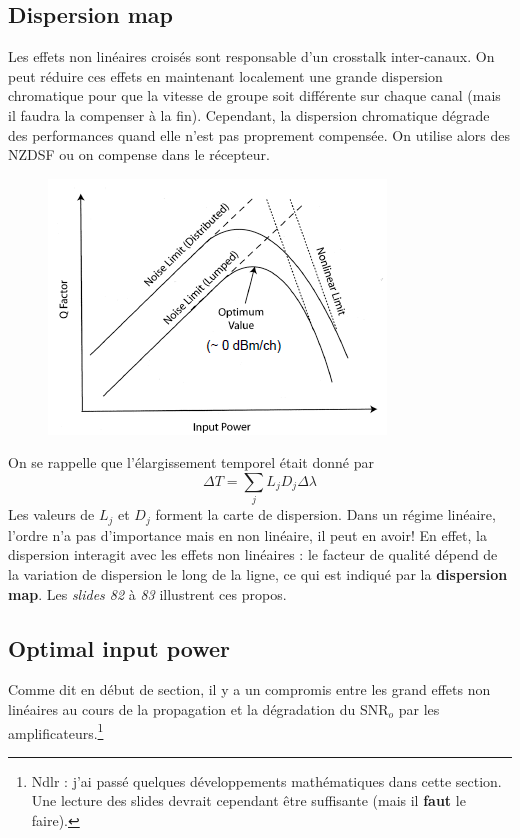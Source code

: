 \subsection{Dispersion map}
Les effets non linéaires croisés sont responsable d'un crosstalk inter-canaux. On peut réduire
ces effets en maintenant localement une grande dispersion chromatique pour que la vitesse de groupe
soit différente sur chaque canal (mais il faudra la compenser à la fin). Cependant, la dispersion
chromatique dégrade des performances quand elle n'est pas proprement compensée. On utilise alors des
NZDSF ou on compense dans le récepteur. \\

\newpage
\begin{figure}
	\includegraphics[scale=0.65]{ch6/image35}
	\end{figure}
On se rappelle que l'élargissement temporel était donné par
\begin{equation}
\Delta T = \sum\limits_j {{L_j}{D_j}} \Delta \lambda 
\end{equation}
Les valeurs de $L_j$ et $D_j$ forment la carte de dispersion. Dans un régime linéaire, l'ordre
n'a pas d'importance mais en non linéaire, il peut en avoir! En effet, la dispersion interagit avec
les effets non linéaires : le facteur de qualité dépend de la variation de dispersion le long
de la ligne, ce qui est indiqué par la \textbf{dispersion map}. Les \textit{slides 82} à 
\textit{83} illustrent ces propos. 

\subsection{Optimal input power}
Comme dit en début de section, il y a un compromis entre les grand effets non linéaires au cours
de la propagation et la dégradation du SNR$_o$ par les amplificateurs.\footnote{Ndlr : j'ai passé
quelques développements mathématiques dans cette section. Une lecture des slides devrait cependant
être suffisante (mais il \textbf{faut} le faire).}

